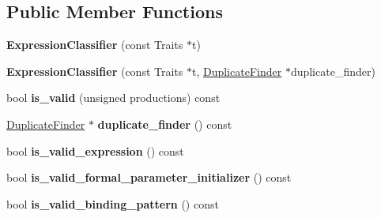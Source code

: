 \subsection*{Public Member Functions}
\begin{DoxyCompactItemize}
\item 
{\bfseries Expression\+Classifier} (const Traits $\ast$t)\hypertarget{classv8_1_1internal_1_1_expression_classifier_a6a93c3871f9a606bdecbfe9fca738659}{}\label{classv8_1_1internal_1_1_expression_classifier_a6a93c3871f9a606bdecbfe9fca738659}

\item 
{\bfseries Expression\+Classifier} (const Traits $\ast$t, \hyperlink{classv8_1_1internal_1_1_duplicate_finder}{Duplicate\+Finder} $\ast$duplicate\+\_\+finder)\hypertarget{classv8_1_1internal_1_1_expression_classifier_a0737ebff5f52511ab3630d3869c08ebe}{}\label{classv8_1_1internal_1_1_expression_classifier_a0737ebff5f52511ab3630d3869c08ebe}

\item 
bool {\bfseries is\+\_\+valid} (unsigned productions) const \hypertarget{classv8_1_1internal_1_1_expression_classifier_a62172409030239d5b825ef50205475b0}{}\label{classv8_1_1internal_1_1_expression_classifier_a62172409030239d5b825ef50205475b0}

\item 
\hyperlink{classv8_1_1internal_1_1_duplicate_finder}{Duplicate\+Finder} $\ast$ {\bfseries duplicate\+\_\+finder} () const \hypertarget{classv8_1_1internal_1_1_expression_classifier_ad1440c2a938e2eec7b8fe61c32df507a}{}\label{classv8_1_1internal_1_1_expression_classifier_ad1440c2a938e2eec7b8fe61c32df507a}

\item 
bool {\bfseries is\+\_\+valid\+\_\+expression} () const \hypertarget{classv8_1_1internal_1_1_expression_classifier_ac2a5996d6d1b11c2db50f9a2cdd458f0}{}\label{classv8_1_1internal_1_1_expression_classifier_ac2a5996d6d1b11c2db50f9a2cdd458f0}

\item 
bool {\bfseries is\+\_\+valid\+\_\+formal\+\_\+parameter\+\_\+initializer} () const \hypertarget{classv8_1_1internal_1_1_expression_classifier_acd11d52555cac807a5a7d1f5d541c758}{}\label{classv8_1_1internal_1_1_expression_classifier_acd11d52555cac807a5a7d1f5d541c758}

\item 
bool {\bfseries is\+\_\+valid\+\_\+binding\+\_\+pattern} () const \hypertarget{classv8_1_1internal_1_1_expression_classifier_a643f4a0b49192666f9a0c02eac625261}{}\label{classv8_1_1internal_1_1_expression_classifier_a643f4a0b49192666f9a0c02eac625261}


\end{DoxyCompactItemize}
